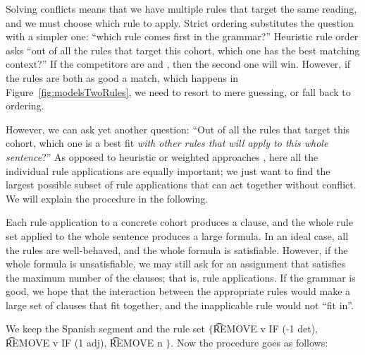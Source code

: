 Solving conflicts means that we have multiple rules that target the same reading, and we must choose which rule to apply.
Strict ordering substitutes the question with a simpler one: ``which rule comes first in the grammar?''
Heuristic rule order asks ``out of all the rules that target this cohort, which one has the best matching context?''
If the competitors are  and , then the second one will win. However, if the rules are both as good a match, which happens in Figure~\ref{fig:modelsTwoRules}, we need to resort to mere guessing, or fall back to ordering.

However, we can ask yet another question: ``Out of all the rules that target this cohort, which one is a best fit \emph{with other rules that will apply to this whole sentence}?''
As opposed to heuristic or weighted approaches \cite{voutilainen1994designing,oflazer97votingconstraints}, here all the individual rule applications are
equally important; we just want to find the largest possible subset of rule applications that can act together without conflict.
We will explain the procedure in the following.

Each rule application to a concrete cohort produces a clause,
and the whole rule set applied to the whole sentence produces
a large formula. In an ideal case, all the rules are well-behaved,
and the whole formula is satisfiable. However, if the whole formula
is unsatisfiable, we may still ask for an assignment that satisfies
the maximum number of the clauses; that is, rule applications.
If the grammar is good, we hope that the interaction between
the appropriate rules would make a large set of clauses that
fit together, and the inapplicable rule would not ``fit in''.


We keep the Spanish segment and the rule set $\{$\t{REMOVE v IF (-1 det)}, \t{REMOVE v IF (1 adj)}, \t{REMOVE n} $\}$.
Now the procedure goes as follows:

